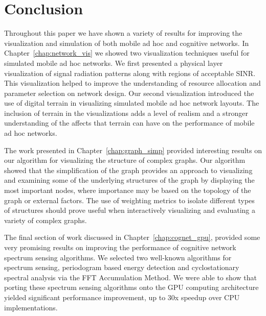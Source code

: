 \chapter{Conclusion}
\label{chap:conclusion}
Throughout this paper we have shown a variety of results for improving the visualization and simulation of both mobile ad hoc and cognitive networks.  In Chapter~\ref{chap:network_vis} we showed two visualization techniques useful for simulated mobile ad hoc networks.  We first presented a physical layer visualization of signal radiation patterns along with regions of acceptable SINR.  This visualization helped to improve the understanding of resource allocation and parameter selection on network design.  Our second visualization introduced the use of digital terrain in visualizing simulated mobile ad hoc network layouts.  The inclusion of terrain in the visualizations adds a level of realism and a stronger understanding of the affects that terrain can have on the performance of mobile ad hoc networks.

The work presented in Chapter~\ref{chap:graph_simp} provided interesting results on our algorithm for visualizing the structure of complex graphs.  Our algorithm showed that the simplification of the graph provides an approach to visualizing and examining some of the underlying structures of the graph by displaying the most important nodes, where importance may be based on the topology of the graph or external factors.  The use of weighting metrics to isolate different types of structures should prove useful when interactively visualizing and evaluating a variety of complex graphs.

The final section of work discussed in Chapter~\ref{chap:cognet_gpu}, provided some very promising results on improving the performance of cognitive network spectrum sensing algorithms.  We selected two well-known algorithms for spectrum sensing, periodogram based energy detection and cyclostationary spectral analysis via the FFT Accumulation Method.  We were able to show that porting these spectrum sensing algorithms onto the GPU computing architecture yielded significant performance improvement, up to 30x speedup over CPU implementations.
